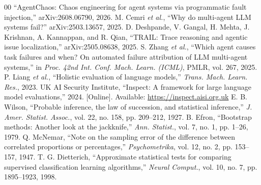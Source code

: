 \documentclass[conference,a4paper]{IEEEtran}
\begin{document}
\begin{thebibliography}{00}
 ``AgentChaos: Chaos engineering for agent systems via programmatic fault injection,'' arXiv:2608.06790, 2026.
 M. Cemri \textit{et al.}, ``Why do multi-agent LLM systems fail?'' arXiv:2503.13657, 2025.
 D. Deshpande, V. Gangal, H. Mehta, J. Krishnan, A. Kannappan, and R. Qian, ``TRAIL: Trace reasoning and agentic issue localization,'' arXiv:2505.08638, 2025.
 S. Zhang \textit{et al.}, ``Which agent causes task failures and when? On automated failure attribution of LLM multi-agent systems,'' in \textit{Proc. 42nd Int. Conf. Mach. Learn. (ICML)}, PMLR, vol. 267, 2025.
 P. Liang \textit{et al.}, ``Holistic evaluation of language models,'' \textit{Trans. Mach. Learn. Res.}, 2023.
 UK AI Security Institute, ``Inspect: A framework for large language model evaluations,'' 2024. [Online]. Available: \url{https://inspect.aisi.org.uk}
 E. B. Wilson, ``Probable inference, the law of succession, and statistical inference,'' \textit{J. Amer. Statist. Assoc.}, vol. 22, no. 158, pp. 209--212, 1927.
 B. Efron, ``Bootstrap methods: Another look at the jackknife,'' \textit{Ann. Statist.}, vol. 7, no. 1, pp. 1--26, 1979.
 Q. McNemar, ``Note on the sampling error of the difference between correlated proportions or percentages,'' \textit{Psychometrika}, vol. 12, no. 2, pp. 153--157, 1947.
 T. G. Dietterich, ``Approximate statistical tests for comparing supervised classification learning algorithms,'' \textit{Neural Comput.}, vol. 10, no. 7, pp. 1895--1923, 1998.
\end{thebibliography}
\end{document}
